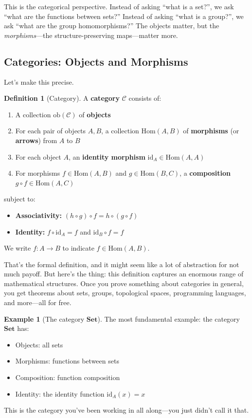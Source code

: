 \documentclass[11pt]{article}
\newcommand{\cat}[1]{\mathbf{#1}}
\newcommand{\Set}{\cat{Set}}
\newcommand{\ob}{\mathrm{ob}}
\newcommand{\Hom}{\mathrm{Hom}}
\newcommand{\id}{\mathrm{id}}
\theoremstyle{definition}
\newtheorem{definition}{Definition}[section]
\newtheorem{example}{Example}[section]
\theoremstyle{plain}
\theoremstyle{remark}
\begin{document}
This is the categorical perspective. Instead of asking ``what is a set?'', we ask ``what are the functions between sets?'' Instead of asking ``what is a group?'', we ask ``what are the group homomorphisms?'' The objects matter, but the \emph{morphisms}---the structure-preserving maps---matter more.

\subsection{Categories: Objects and Morphisms}

Let's make this precise.

\begin{definition}[Category]
A \textbf{category} $\mathcal{C}$ consists of:
\begin{enumerate}
  \item A collection $\ob(\mathcal{C})$ of \textbf{objects}
  \item For each pair of objects $A, B$, a collection $\Hom(A, B)$ of \textbf{morphisms} (or \textbf{arrows}) from $A$ to $B$
  \item For each object $A$, an \textbf{identity morphism} $\id_A \in \Hom(A, A)$
  \item For morphisms $f \in \Hom(A, B)$ and $g \in \Hom(B, C)$, a \textbf{composition} $g \circ f \in \Hom(A, C)$
\end{enumerate}
subject to:
\begin{itemize}
  \item \textbf{Associativity:} $(h \circ g) \circ f = h \circ (g \circ f)$
  \item \textbf{Identity:} $f \circ \id_A = f$ and $\id_B \circ f = f$
\end{itemize}
\end{definition}

We write $f: A \to B$ to indicate $f \in \Hom(A, B)$.

That's the formal definition, and it might seem like a lot of abstraction for not much payoff. But here's the thing: this definition captures an enormous range of mathematical structures. Once you prove something about categories in general, you get theorems about sets, groups, topological spaces, programming languages, and more---all for free.

\begin{example}[The category $\Set$]
The most fundamental example: the category $\Set$ has:
\begin{itemize}
  \item Objects: all sets
  \item Morphisms: functions between sets
  \item Composition: function composition
  \item Identity: the identity function $\id_A(x) = x$
\end{itemize}
This is the category you've been working in all along---you just didn't call it that.
\end{example}
\end{document}
